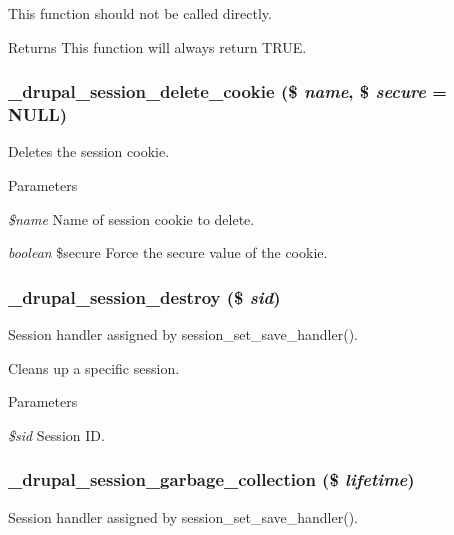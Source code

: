 This function should not be called directly.

\begin{DoxyReturn}{Returns}
This function will always return TRUE. 
\end{DoxyReturn}
\hypertarget{session_8inc_a8e37ac914709ebe5fd2a90a05ef9d07d}{
\subsubsection[{\_\-drupal\_\-session\_\-delete\_\-cookie}]{\setlength{\rightskip}{0pt plus 5cm}\_\-drupal\_\-session\_\-delete\_\-cookie (\$ {\em name}, \/  \$ {\em secure} = {\ttfamily NULL})}}
\label{session_8inc_a8e37ac914709ebe5fd2a90a05ef9d07d}
Deletes the session cookie.


\begin{DoxyParams}{Parameters}
\item[{\em \$name}]Name of session cookie to delete. \item[{\em boolean}]\$secure Force the secure value of the cookie. \end{DoxyParams}
\hypertarget{session_8inc_af8a3df8c027292c59745d5ce00025480}{
\subsubsection[{\_\-drupal\_\-session\_\-destroy}]{\setlength{\rightskip}{0pt plus 5cm}\_\-drupal\_\-session\_\-destroy (\$ {\em sid})}}
\label{session_8inc_af8a3df8c027292c59745d5ce00025480}
Session handler assigned by session\_\-set\_\-save\_\-handler().

Cleans up a specific session.


\begin{DoxyParams}{Parameters}
\item[{\em \$sid}]Session ID. \end{DoxyParams}
\hypertarget{session_8inc_a27392dffc0efaa15d678b516379eec99}{
\subsubsection[{\_\-drupal\_\-session\_\-garbage\_\-collection}]{\setlength{\rightskip}{0pt plus 5cm}\_\-drupal\_\-session\_\-garbage\_\-collection (\$ {\em lifetime})}}
\label{session_8inc_a27392dffc0efaa15d678b516379eec99}
Session handler assigned by session\_\-set\_\-save\_\-handler().

